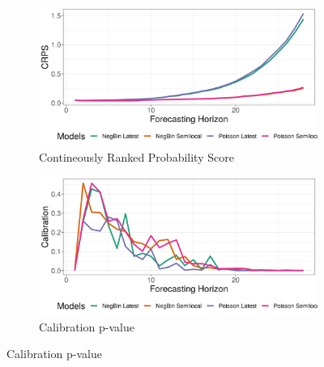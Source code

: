 \begin{figure}[H]
\begin{subfigure}{0.5\textwidth}
  \centering
  \includegraphics[width=\linewidth]{../output/Alimbongo_crps.png}  
  \caption{Contineously Ranked Probability Score}
  \label{Alimbongo_scores_1}
\end{subfigure}
\begin{subfigure}{0.5\textwidth}
  \centering
  \includegraphics[width=\linewidth]{../output/Alimbongo_calibration.png}  
  \caption{Calibration p-value}
  \label{Alimbongo_scores_2}
\end{subfigure}


\end{figure}
